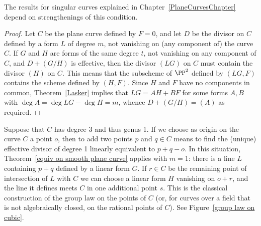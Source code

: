  The results for singular curves explained in Chapter~\ref{PlaneCurvesChapter}
 depend on strengthenings  of this condition.
 
\begin{proof}
Let $C$ be the plane curve defined by $F=0$, and let $D$ be the divisor on $C$ defined by a form $L$
of degree $m$, not vanishing on (any component of) the curve $C$. If $G$ and $H$ are forms of the same degree $t$, 
not vanishing on any component of $C$,
and $D+(G/H)$ is effective, then the divisor $(LG)$  on $C$ must contain the divisor $(H)$ on $C$.
This means that the subscheme of $\PP^{2}$ defined by $(LG,F)$ contains the scheme defined 
by $(H,F)$. Since $H$ and $F$ have no components in common, Theorem~\ref{Lasker} implies
that $LG = AH+BF$  for some forms $A,B$ with $\deg A = \deg LG -\deg H = m$,
 whence $D+(G/H) = (A)$
as required.
\end{proof}

\begin{example}
Suppose that $C$ has degree 3 and thus genus 1. If we choose as origin on the curve $C$ a point $o$, then to add two points $p$ and $q \in C$ means to find the (unique) effective divisor of degree 1 linearly equivalent to $p + q - o$. In this situation, Theorem~\ref{equiv on smooth plane curve} applies with $m=1$: there is a line $L$ 
containing $p+q$ defined by a linear form $G$. If $r \in C$ be the remaining point of intersection of $L$ with $C$ we can choose a linear form $H$ vanishing on $o+r$, and the line it defines meets $C$
in one additional point $s$. This is the classical construction of the 
%
group law
on the points of $C$ (or,
for curves over a field that is not algebraically closed, on the rational points of $C$).
See Figure~\ref{group law on cubic}.
\end{example}

